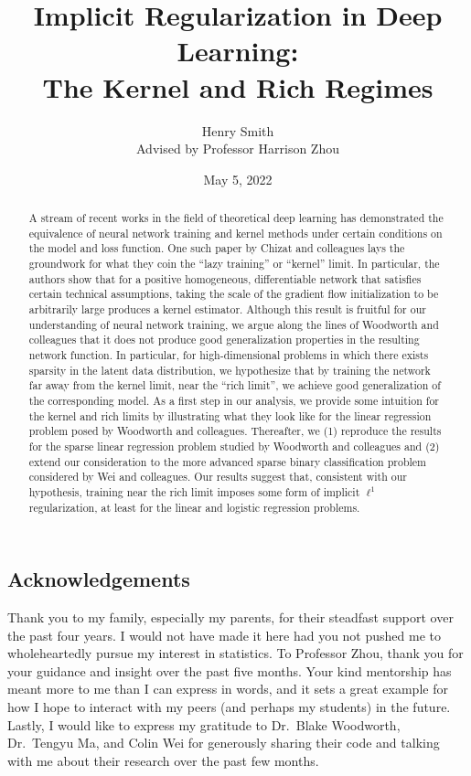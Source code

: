 \documentclass{article}
\title{\textbf{Implicit Regularization in Deep Learning:\\The Kernel and Rich Regimes}}
\author[]{Henry Smith\\
Advised by Professor Harrison Zhou}
\affil[]{\normalsize Department of Statistics \& Data Science\\Yale University}
\date{May 5, 2022}
\begin{document}
\maketitle

\begin{abstract}
\noindent
A stream of recent works in the field of theoretical deep learning has demonstrated the equivalence of neural network training and kernel methods under certain conditions on the model and loss function. One such paper by Chizat and colleagues lays the groundwork for what they coin the \enquote{lazy training} or \enquote{kernel} limit. In particular, the authors show that for a positive homogeneous, differentiable network that satisfies certain technical assumptions, taking the scale of the gradient flow initialization to be arbitrarily large produces a kernel estimator. Although this result is fruitful for our understanding of neural network training, we argue along the lines of Woodworth and colleagues that it does not produce good generalization properties in the resulting network function. In particular, for high-dimensional problems in which there exists sparsity in the latent data distribution, we hypothesize that by training the network far away from the kernel limit, near the \enquote{rich limit}, we achieve good generalization of the corresponding model. As a first step in our analysis, we provide some intuition for the kernel and rich limits by illustrating what they look like for the linear regression problem posed by Woodworth and colleagues. Thereafter, we (1) reproduce the results for the sparse linear regression problem studied by Woodworth and colleagues and (2) extend our consideration to the more advanced sparse binary classification problem considered by Wei and colleagues. Our results suggest that, consistent with our hypothesis, training near the rich limit imposes some form of implicit $\ell^1$ regularization, at least for the linear and logistic regression problems.
\end{abstract}

\pagebreak

\vspace*{\fill}

\begin{centering}
\section*{Acknowledgements}
Thank you to my family, especially my parents, for their steadfast support over the past four years. I would not have made it here had you not pushed me to wholeheartedly pursue my interest in statistics. To Professor Zhou, thank you for your guidance and insight over the past five months. Your kind mentorship has meant more to me than I can express in words, and it sets a great example for how I hope to interact with my peers (and perhaps my students) in the future. Lastly, I would like to express my gratitude to Dr.~Blake Woodworth, Dr.~Tengyu Ma, and Colin Wei for generously sharing their code and talking with me about their research over the past few months.
\end{centering}
\end{document}
